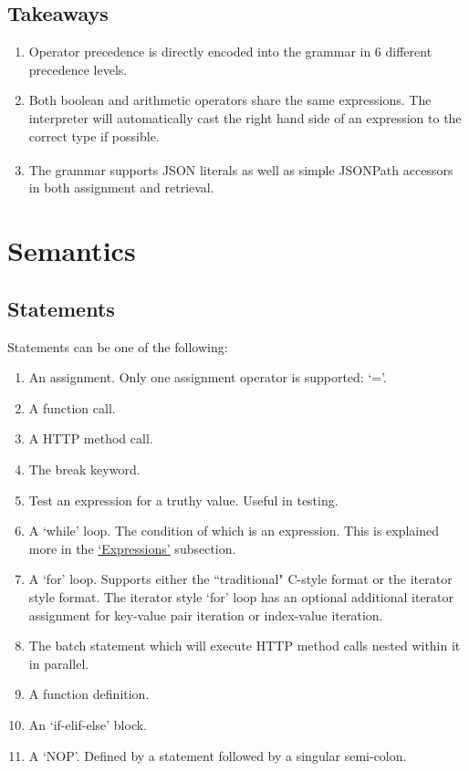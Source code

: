 \documentclass[]{interim}
\theoremstyle{definition}
\begin{document}
\subsection{Takeaways}

\begin{enumerate}
    \item Operator precedence is directly encoded into the grammar in 6 different precedence levels.
    \item Both boolean and arithmetic operators share the same expressions. The interpreter will automatically cast the right hand side of an expression to the correct type if possible.
    \item The grammar supports JSON literals as well as simple JSONPath\textsuperscript{\cite{goessner_2007}} accessors in both assignment and retrieval.
\end{enumerate}

\pagebreak

\section{Semantics}

\subsection{Statements}

Statements can be one of the following:

\begin{center}
    \begin{enumerate}
        \item An assignment. Only one assignment operator is supported: `='.
        \item A function call.
        \item A HTTP method call.
        \item The break keyword.
        \item Test an expression for a truthy value. Useful in testing.
        \item A `while' loop. The condition of which is an expression. This is explained more in the \hyperref[sec:expressions]{`Expressions'} subsection.
        \item A `for' loop. Supports either the ``traditional" C-style format or the iterator style format. The iterator style `for' loop has an optional additional iterator assignment for key-value pair iteration or index-value iteration.
        \item The batch statement which will execute HTTP method calls nested within it in parallel.
        \item A function definition.
        \item An `if-elif-else' block.
        \item A `NOP'. Defined by a statement followed by a singular semi-colon.
    \end{enumerate}
\end{center}
\end{document}
